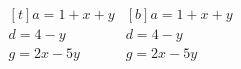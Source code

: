 $
      \begin{gathered}[t]
      a = 1 + x + y \\
      d = 4 - y     \\
      g = 2x - 5y
      \end{gathered}
      \begin{gathered}[b]
      a = 1 + x + y \\
      d = 4 - y     \\
      g = 2x - 5y
      \end{gathered}
$
